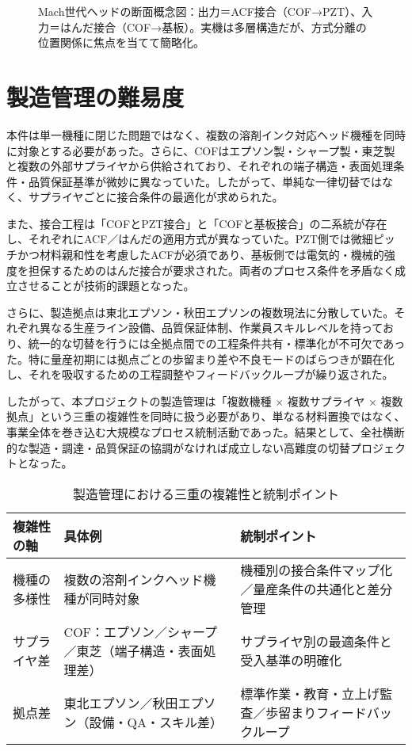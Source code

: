\documentclass[conference]{IEEEtran}
\begin{document}
\begin{figure}[t]
\caption{Mach世代ヘッドの断面概念図：\;出力＝ACF接合（COF→PZT）、入力＝はんだ接合（COF→基板）。実機は多層構造だが、方式分離の位置関係に焦点を当てて簡略化。}
\label{fig:structure_dual_bond}
\end{figure}

\section{製造管理の難易度}
本件は単一機種に閉じた問題ではなく、複数の溶剤インク対応ヘッド機種を同時に対象とする必要があった。さらに、COFはエプソン製・シャープ製・東芝製と複数の外部サプライヤから供給されており、それぞれの端子構造・表面処理条件・品質保証基準が微妙に異なっていた。したがって、単純な一律切替ではなく、サプライヤごとに接合条件の最適化が求められた。  

また、接合工程は「COFとPZT接合」と「COFと基板接合」の二系統が存在し、それぞれにACF／はんだの適用方式が異なっていた。PZT側では微細ピッチかつ材料親和性を考慮したACFが必須であり、基板側では電気的・機械的強度を担保するためのはんだ接合が要求された。両者のプロセス条件を矛盾なく成立させることが技術的課題となった。  

さらに、製造拠点は東北エプソン・秋田エプソンの複数現法に分散していた。それぞれ異なる生産ライン設備、品質保証体制、作業員スキルレベルを持っており、統一的な切替を行うには全拠点間での工程条件共有・標準化が不可欠であった。特に量産初期には拠点ごとの歩留まり差や不良モードのばらつきが顕在化し、それを吸収するための工程調整やフィードバックループが繰り返された。  

したがって、本プロジェクトの製造管理は「複数機種 × 複数サプライヤ × 複数拠点」という三重の複雑性を同時に扱う必要があり、単なる材料置換ではなく、事業全体を巻き込む大規模なプロセス統制活動であった。結果として、全社横断的な製造・調達・品質保証の協調がなければ成立しない高難度の切替プロジェクトとなった。

\begin{table}[t]
\centering
\footnotesize
\caption{製造管理における三重の複雑性と統制ポイント}
\label{tab:complexity}
\renewcommand{\arraystretch}{1.1}
\begin{tabularx}{\columnwidth}{@{}p{2.4cm} Y Y@{}}
\toprule
複雑性の軸 & 具体例 & 統制ポイント \\
\midrule
機種の多様性 &
複数の溶剤インクヘッド機種が同時対象 &
機種別の接合条件マップ化／量産条件の共通化と差分管理 \\
\addlinespace[2pt]
サプライヤ差 &
COF：エプソン／シャープ／東芝（端子構造・表面処理差） &
サプライヤ別の最適条件と受入基準の明確化 \\
\addlinespace[2pt]
拠点差 &
東北エプソン／秋田エプソン（設備・QA・スキル差） &
標準作業・教育・立上げ監査／歩留まりフィードバックループ \\
\bottomrule
\end{tabularx}
\end{table}
\end{document}
